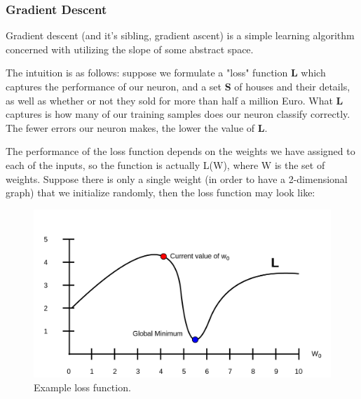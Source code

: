 \documentclass[a4paper, 12pt]{article}
\begin{document}
                    \subsubsection{Gradient Descent}
                    
                        \par Gradient descent (and it's sibling, gradient ascent) is a simple learning algorithm concerned with utilizing the slope of some abstract space. 
                        
                        \par The intuition is as follows: suppose we formulate a "loss" function \textbf{L} which captures the performance of our neuron, and a set \textbf{S} of houses and their details, as well as whether or not they sold for more than half a million Euro. What \textbf{L} captures is how many of our training samples does our neuron classify correctly. The fewer errors our neuron makes, the lower the value of \textbf{L}.
                        
                        \par The performance of the loss function depends on the weights we have assigned to each of the inputs, so the function is actually L(W), where W is the set of weights. Suppose there is only a single weight (in order to have a 2-dimensional graph) that we initialize randomly, then the loss function may look like:
                        
                        \begin{figure}[h]
                            \caption{Example loss function.}
                            \centering
                            \includegraphics[width=\textwidth]{lossFunction0}
                        \end{figure}
                        
\end{document}
